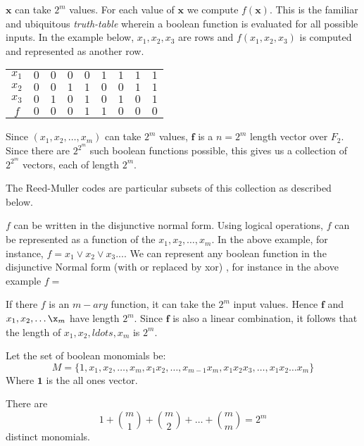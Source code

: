 \documentclass{article}
\newcommand{\V}[1]{\ensuremath{\mathbf{#1}}}
\theoremstyle{plain}
\begin{document}
$\V{x}$ can take $2^m$ values. For each value of $\V{x}$ we compute $f(\V{x})$. This is the familiar and ubiquitous \emph{truth-table} wherein a boolean function is evaluated for all possible inputs.
In the example below, $x_1, x_2, x_3$ are rows and $f(x_1, x_2, x_3)$ is computed and represented as another row. 
\begin {center}
\begin{tabular}{|c|c|c|c|c|c|c|c|c|}
$x_1$ & $0$ & $0$ & $0$ & $0$ & $1$ & $1$ & $1$ & $1$ \\
$x_2$ & $0$ & $0$ & $1$ & $1$ & $0$ & $0$ & $1$ & $1$ \\
$x_3$ & $0$ & $1$ & $0$ & $1$ & $0$ & $1$ & $0$ & $1$ \\
$f$   & $0$ & $0$ & $0$ & $1$ & $1$ & $0$ & $0$ & $0$ \\

\end{tabular}
\end{center} 

Since $(x_1,x_2,\ldots,x_m)$ can take $2^m$ values, $\V{f}$ is a $n=2^m$ length vector over $F_2$. Since there are $2^2^m$ such boolean functions possible, this gives us a collection of  $2^2^m$ vectors, each of length $2^m$.
 
The Reed-Muller codes are particular subsets of this collection as described below.

$f$ can be written in the disjunctive normal form.
Using logical operations, $f$ can be represented as a function of the $x_1, x_2,\ldots , x_m$. In the above example, for instance, $f = x_1 \vee x_2 \vee x_3 ... $. We can represent any boolean function in the disjunctive Normal form (with or replaced by xor) \cite{Problem2}, for instance in the above example $f = $

If there $f$ is an $m-ary$ function, it can take the $2^m$ input values. Hence $\V{f}$ and $x_1,x_2,\ldots \x_m$ have length $2^m$. Since $\V{f}$ is also a linear combination, it follows that the length of $x_1, x_2,ldots,x_m$ is $2^m$. 

Let the set of boolean monomials be:
\begin{equation*}
M = \{1,x_1,x_2,\ldots,x_m,x_1x_2,\ldots,x_{m-1}x_m,x_1x_2x_3,\ldots,x_1x_2\ldots x_m\}
\end{equation*}
Where $\V{1}$ is the all ones vector.

There are
\begin{equation*}
  1+\binom{m}{1}+\binom{m}{2}+\ldots+\binom{m}{m} = 2^m 
\end{equation*}
distinct monomials. 
\end{document}
